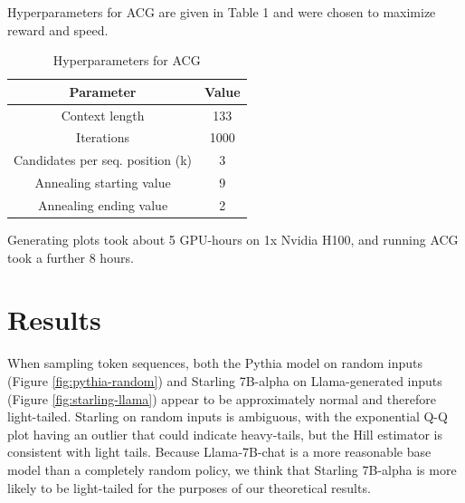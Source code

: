 \documentclass{article}
\begin{document}
Hyperparameters for ACG are given in Table 1 and were chosen to maximize reward and speed.

\begin{table}
    \centering
    \begin{tabular}{|c|c|}
        \hline
        Parameter & Value \\
        \hline
        Context length & 133 \\
        \hline
        Iterations & 1000 \\
        \hline
        Candidates per seq. position (k) & 3 \\
        \hline
        Annealing starting value & 9 \\
        \hline
        Annealing ending value & 2 \\
        \hline
    \end{tabular}
\caption{Hyperparameters for ACG}
\end{table}

Generating plots took about 5 GPU-hours on 1x Nvidia H100, and running ACG took a further 8 hours.

\section{Results\label{sec:experiments}}

When sampling token sequences, both the Pythia model on random inputs (Figure \ref{fig:pythia-random}) and Starling 7B-alpha on Llama-generated inputs (Figure \ref{fig:starling-llama}) appear to be approximately normal and therefore light-tailed. Starling on random inputs is ambiguous, with the exponential Q-Q plot having an outlier that could indicate heavy-tails, but the Hill estimator is consistent with light tails. Because Llama-7B-chat is a more reasonable base model than a completely random policy, we think that Starling 7B-alpha is more likely to be light-tailed for the purposes of our theoretical results.
\end{document}
